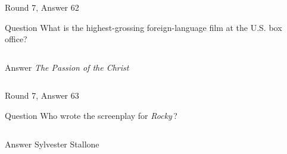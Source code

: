 \documentclass[11pt]{beamer}
\begin{document}
\begin{frame}[t]{Round 7, Answer 62}
  \vspace{2em}
  \begin{block}{Question}
    What is the highest-grossing foreign-language film at the U.S. box office?
  \end{block}
  \pause{}
  \begin{columns}[T,totalwidth=\linewidth]
    \begin{column}{0.35\linewidth}
      \begin{block}{Answer}
        \emph{The Passion of the Christ}
      \end{block}
    \end{column}
    \begin{column}{0.6\linewidth}
      \begin{center}
        \texttt{[image: \{Images/passionchrist]}.JPG}
      \end{center}
    \end{column}
  \end{columns}
\end{frame}


\begin{frame}[t]{Round 7, Answer 63}
  \vspace{2em}
  \begin{block}{Question}
    Who wrote the screenplay for \emph{Rocky}\,?
  \end{block}
  \pause{}
  \begin{columns}[T,totalwidth=\linewidth]
    \begin{column}{0.35\linewidth}
      \begin{block}{Answer}
        Sylvester Stallone
      \end{block}
    \end{column}
    \begin{column}{0.6\linewidth}
      \begin{center}
        \texttt{[image: \{Images/rocky]}.jpg}
      \end{center}
    \end{column}
  \end{columns}
\end{frame}
\end{document}
